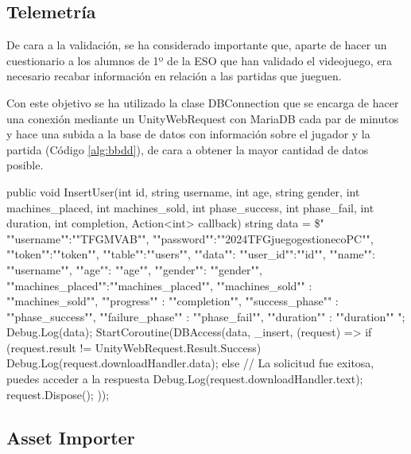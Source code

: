 \subsection{Telemetría}

De cara a la validación, se ha considerado importante que, aparte de hacer un cuestionario a los alumnos de 1º de la ESO que han validado el videojuego, era necesario recabar información en relación a las partidas que jueguen. 

Con este objetivo se ha utilizado la clase DBConnection que se encarga de hacer una conexión mediante un UnityWebRequest con MariaDB cada par de minutos y hace una subida a la base de datos con información sobre el jugador y la partida (Código \ref{alg:bbdd}), de cara a obtener la mayor cantidad de datos posible.
\begin{mypython}[caption={Código para hacer inserciones en la BBDD.},label={alg:bbdd}]
public void InsertUser(int id, string username, int age, 
    string gender, int machines_placed, int machines_sold, 
    int phase_success, int phase_fail, int duration, 
    int completion, Action<int> callback)
{
    string data = \$\@"{{
                    ""username"":""TFGMVAB"", 
                    ""password"":""2024TFGjuegogestionecoPC"", 
                    ""token"":""{token}"",
                    ""table"":""users"",
                    ""data"": {
                     {""user_id"":""{id}"",
                     ""name"": ""{username}"",
                     ""age"": ""{age}"",
                     ""gender"": ""{gender}"",
                     ""machines_placed"":""{machines_placed}"",
                     ""machines_sold"" : ""{machines_sold}"",
                     ""progress"" : ""{completion}"",
                     ""success_phase"" : ""{phase_success}"",
                     ""failure_phase"" : ""{phase_fail}"",
                     ""duration"" : ""{duration}""}}
    }}";
    Debug.Log(data);
    StartCoroutine(DBAccess(data, _insert, (request) =>
    {
        if (request.result != UnityWebRequest.Result.Success)
        {
            Debug.Log(request.downloadHandler.data);
        }
        else
        {
            // La solicitud fue exitosa, puedes acceder a la respuesta
            Debug.Log(request.downloadHandler.text);
        }
        request.Dispose();
    }));
}
\end{mypython}

\subsection{Asset Importer}


